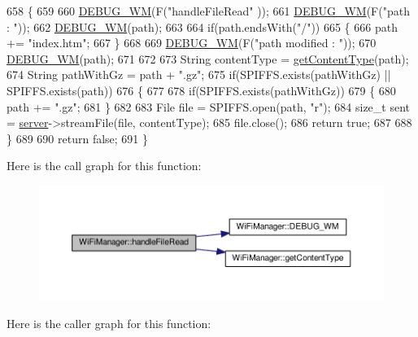 \begin{DoxyCode}
658 \{
659 
660     \hyperlink{class_wi_fi_manager_ae5f595c670ccbcf9a191baf50f5c7c26}{DEBUG\_WM}(F(\textcolor{stringliteral}{"handleFileRead"} ));
661     \hyperlink{class_wi_fi_manager_ae5f595c670ccbcf9a191baf50f5c7c26}{DEBUG\_WM}(F(\textcolor{stringliteral}{"path : "}));
662     \hyperlink{class_wi_fi_manager_ae5f595c670ccbcf9a191baf50f5c7c26}{DEBUG\_WM}(path);
663 
664     \textcolor{keywordflow}{if}(path.endsWith(\textcolor{stringliteral}{"/"}))
665     \{
666         path += \textcolor{stringliteral}{"index.htm"};
667     \}
668 
669     \hyperlink{class_wi_fi_manager_ae5f595c670ccbcf9a191baf50f5c7c26}{DEBUG\_WM}(F(\textcolor{stringliteral}{"path modified : "}));
670     \hyperlink{class_wi_fi_manager_ae5f595c670ccbcf9a191baf50f5c7c26}{DEBUG\_WM}(path);
671     
672     
673     String contentType = \hyperlink{class_wi_fi_manager_a40f123fd290c3e331c9785d19a88f3b8}{getContentType}(path);
674     String pathWithGz = path + \textcolor{stringliteral}{".gz"};
675     \textcolor{keywordflow}{if}(SPIFFS.exists(pathWithGz) || SPIFFS.exists(path))
676     \{
677 
678         \textcolor{keywordflow}{if}(SPIFFS.exists(pathWithGz))
679         \{
680             path += \textcolor{stringliteral}{".gz"};
681         \}
682 
683         File file = SPIFFS.open(path, \textcolor{stringliteral}{"r"});
684         \textcolor{keywordtype}{size\_t} sent = \hyperlink{class_wi_fi_manager_a509523a01c0395cf0dc235b074f2a5ea}{server}->streamFile(file, contentType);
685         file.close();
686         \textcolor{keywordflow}{return} \textcolor{keyword}{true};
687 
688     \}
689 
690     \textcolor{keywordflow}{return} \textcolor{keyword}{false};
691 \}
\end{DoxyCode}
Here is the call graph for this function\+:
\nopagebreak
\begin{figure}[H]
\begin{center}
\leavevmode
\includegraphics[width=350pt]{d4/dc8/class_wi_fi_manager_a9e802fa4ca834a622f058a7176f47806_cgraph}
\end{center}
\end{figure}
Here is the caller graph for this function\+:
